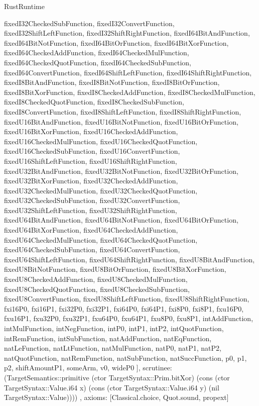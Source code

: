 \begin{lexlean}{RustRuntime}
\begin{semanticmodule}
{{      fixedI32CheckedSubFunction,
      fixedI32ConvertFunction,
      fixedI32ShiftLeftFunction,
      fixedI32ShiftRightFunction,
      fixedI64BitAndFunction,
      fixedI64BitNotFunction,
      fixedI64BitOrFunction,
      fixedI64BitXorFunction,
      fixedI64CheckedAddFunction,
      fixedI64CheckedMulFunction,
      fixedI64CheckedQuotFunction,
      fixedI64CheckedSubFunction,
      fixedI64ConvertFunction,
      fixedI64ShiftLeftFunction,
      fixedI64ShiftRightFunction,
      fixedI8BitAndFunction,
      fixedI8BitNotFunction,
      fixedI8BitOrFunction,
      fixedI8BitXorFunction,
      fixedI8CheckedAddFunction,
      fixedI8CheckedMulFunction,
      fixedI8CheckedQuotFunction,
      fixedI8CheckedSubFunction,
      fixedI8ConvertFunction,
      fixedI8ShiftLeftFunction,
      fixedI8ShiftRightFunction,
      fixedU16BitAndFunction,
      fixedU16BitNotFunction,
      fixedU16BitOrFunction,
      fixedU16BitXorFunction,
      fixedU16CheckedAddFunction,
      fixedU16CheckedMulFunction,
      fixedU16CheckedQuotFunction,
      fixedU16CheckedSubFunction,
      fixedU16ConvertFunction,
      fixedU16ShiftLeftFunction,
      fixedU16ShiftRightFunction,
      fixedU32BitAndFunction,
      fixedU32BitNotFunction,
      fixedU32BitOrFunction,
      fixedU32BitXorFunction,
      fixedU32CheckedAddFunction,
      fixedU32CheckedMulFunction,
      fixedU32CheckedQuotFunction,
      fixedU32CheckedSubFunction,
      fixedU32ConvertFunction,
      fixedU32ShiftLeftFunction,
      fixedU32ShiftRightFunction,
      fixedU64BitAndFunction,
      fixedU64BitNotFunction,
      fixedU64BitOrFunction,
      fixedU64BitXorFunction,
      fixedU64CheckedAddFunction,
      fixedU64CheckedMulFunction,
      fixedU64CheckedQuotFunction,
      fixedU64CheckedSubFunction,
      fixedU64ConvertFunction,
      fixedU64ShiftLeftFunction,
      fixedU64ShiftRightFunction,
      fixedU8BitAndFunction,
      fixedU8BitNotFunction,
      fixedU8BitOrFunction,
      fixedU8BitXorFunction,
      fixedU8CheckedAddFunction,
      fixedU8CheckedMulFunction,
      fixedU8CheckedQuotFunction,
      fixedU8CheckedSubFunction,
      fixedU8ConvertFunction,
      fixedU8ShiftLeftFunction,
      fixedU8ShiftRightFunction,
      fxi16P0,
      fxi16P1,
      fxi32P0,
      fxi32P1,
      fxi64P0,
      fxi64P1,
      fxi8P0,
      fxi8P1,
      fxu16P0,
      fxu16P1,
      fxu32P0,
      fxu32P1,
      fxu64P0,
      fxu64P1,
      fxu8P0,
      fxu8P1,
      intAddFunction,
      intMulFunction,
      intNegFunction,
      intP0,
      intP1,
      intP2,
      intQuotFunction,
      intRemFunction,
      intSubFunction,
      natAddFunction,
      natEqFunction,
      natLeFunction,
      natLtFunction,
      natMulFunction,
      natP0,
      natP1,
      natP2,
      natQuotFunction,
      natRemFunction,
      natSubFunction,
      natSuccFunction,
      p0,
      p1,
      p2,
      shiftAmountP1,
      someArm,
      v0,
      wideP0
    ],
    scrutinee: (TargetSemantics::primitive (ctor TargetSyntax::Prim.bitXor) (cons (ctor TargetSyntax::Value.i64 x) (cons (ctor TargetSyntax::Value.i64 y) (nil TargetSyntax::Value))))
  },
  axioms: [Classical.choice, Quot.sound, propext]
}


\end{semanticmodule}
\end{lexlean}
